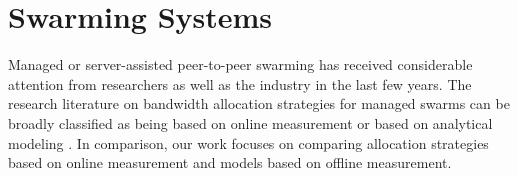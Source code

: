{{}




\section{Swarming Systems}
\label{sec:swarming}


Managed or server-assisted peer-to-peer swarming has received considerable attention from researchers \cite{antfarm, chow,daskleinrock, onserverdimensioning, performance2010, shakkottai} as well as the industry \cite{octoshape,amazons3,kontiki, Akamai} in the last few years. The research literature on bandwidth allocation strategies for managed swarms can be broadly classified as being based on online measurement \cite{antfarm,vformation,chow} or based on analytical modeling \cite{daskleinrock, onserverdimensioning, performance2010, shakkottai}. In comparison, our work focuses on comparing allocation strategies based on online measurement and models based on offline measurement.

}
